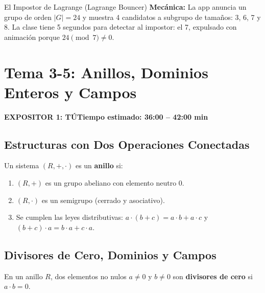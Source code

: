 \documentclass[11pt,a4paper]{article}
\newcommand{\badgeTu}{\colorbox{exp1bg}{\textcolor{exp1fg}{\bfseries\sffamily\footnotesize EXPOSITOR 1: TÚ}}}
\begin{document}
\begin{minijuego}{El Impostor de Lagrange (Lagrange Bouncer)}
\textbf{Mecánica:} La app anuncia un grupo de orden $|G| = 24$ y muestra 4 candidatos a subgrupo de tamaños: 3, 6, 7 y 8. La clase tiene 5 segundos para detectar al impostor: el 7, expulsado con animación porque $24 \pmod 7 \neq 0$.
\end{minijuego}

\newpage

\section{Tema 3-5: Anillos, Dominios Enteros y Campos}
\noindent\badgeTu \hfill \textbf{Tiempo estimado: 36:00 -- 42:00 min}

\subsection{Estructuras con Dos Operaciones Conectadas}
\begin{definicion}[Anillo]
Un sistema $(R, +, \cdot)$ es un \textbf{anillo} si:
\begin{enumerate}[noitemsep]
  \item $(R, +)$ es un grupo abeliano con elemento neutro $0$.
  \item $(R, \cdot)$ es un semigrupo (cerrado y asociativo).
  \item Se cumplen las leyes distributivas: $a \cdot (b + c) = a \cdot b + a \cdot c$ y $(b + c) \cdot a = b \cdot a + c \cdot a$.
\end{enumerate}
\end{definicion}

\subsection{Divisores de Cero, Dominios y Campos}
\begin{definicion}
En un anillo $R$, dos elementos no nulos $a \neq 0$ y $b \neq 0$ son \textbf{divisores de cero} si $a \cdot b = 0$.
\end{definicion}
\end{document}
